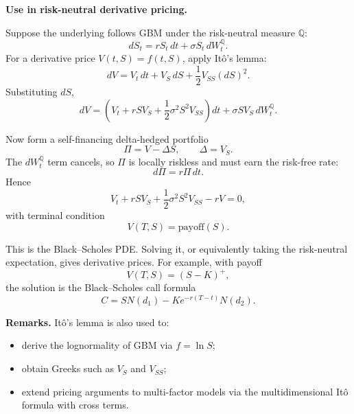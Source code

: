 \documentclass[11pt,letterpaper,openany]{book}
\begin{document}
\textbf{Use in risk-neutral derivative pricing.}

Suppose the underlying follows GBM under the risk-neutral measure \(\mathbb Q\):
\[
dS_t = rS_t\,dt + \sigma S_t\,dW_t^{\mathbb Q}.
\]
For a derivative price \(V(t,S)=f(t,S)\), apply Itô's lemma:
\[
dV
=
V_t\,dt + V_S\,dS + \frac12 V_{SS}(dS)^2.
\]
Substituting \(dS\),
\[
dV
=
\left(V_t + rS V_S + \frac12 \sigma^2 S^2 V_{SS}\right)dt
+
\sigma S V_S\,dW_t^{\mathbb Q}.
\]

Now form a self-financing delta-hedged portfolio
\[
\Pi = V - \Delta S,
\qquad
\Delta = V_S.
\]
The \(dW_t^{\mathbb Q}\) term cancels, so \(\Pi\) is locally riskless and must earn the risk-free rate:
\[
d\Pi = r\Pi\,dt.
\]
Hence
\[
V_t + rS V_S + \frac12 \sigma^2 S^2 V_{SS} - rV = 0,
\]
with terminal condition
\[
V(T,S)=\text{payoff}(S).
\]

This is the Black--Scholes PDE. Solving it, or equivalently taking the risk-neutral expectation, gives derivative prices. For example, with payoff
\[
V(T,S)=(S-K)^+,
\]
the solution is the Black--Scholes call formula
\[
C = S N(d_1) - K e^{-r(T-t)} N(d_2).
\]

\textbf{Remarks.} Itô's lemma is also used to:
\begin{itemize}
\item derive the lognormality of GBM via \(f=\ln S\);
\item obtain Greeks such as \(V_S\) and \(V_{SS}\);
\item extend pricing arguments to multi-factor models via the multidimensional Itô formula with cross terms.
\end{itemize}
\end{document}
